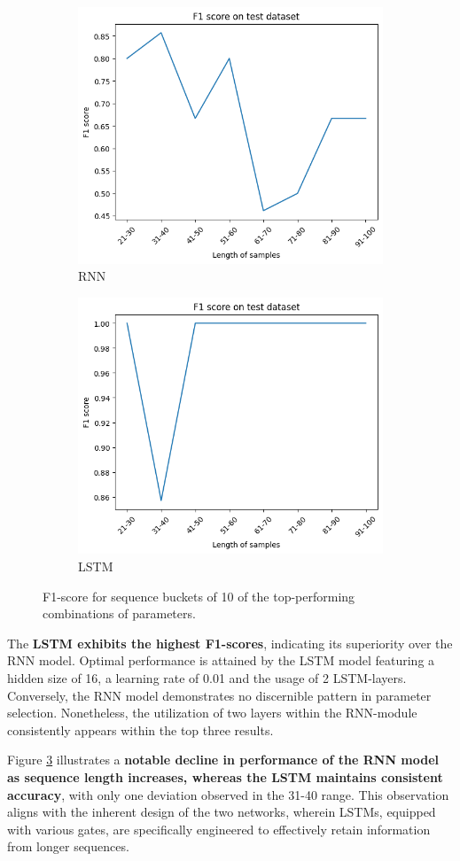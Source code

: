 \documentclass[12pt,a4paper]{article}
\begin{document}
\begin{figure}[!htb]
\centering
\begin{subfigure}{.5\textwidth}
  \centering
  \includegraphics[width=.6\linewidth]{Assignment_3/Report/Figures/rnn.png}
  \caption{RNN}
  \label{fig:sub1}
\end{subfigure}%
\begin{subfigure}{.5\textwidth}
  \centering
  \includegraphics[width=.6\linewidth]{Assignment_3/Report/Figures/lstm.png}
  \caption{LSTM}
  \label{fig:sub2}
\end{subfigure}
\caption{F1-score for sequence buckets of 10 of the top-performing combinations of parameters.}
\label{fig:test}
\end{figure}

The \textbf{LSTM exhibits the highest F1-scores}, indicating its superiority over the RNN model. Optimal performance is attained by the LSTM model featuring a hidden size of 16, a learning rate of 0.01 and the usage of 2 LSTM-layers. Conversely, the RNN model demonstrates no discernible pattern in parameter selection. Nonetheless, the utilization of two layers within the RNN-module consistently appears within the top three results.

Figure \ref{fig:test} illustrates a \textbf{notable decline in performance of the RNN model as sequence length increases, whereas the LSTM maintains consistent accuracy}, with only one deviation observed in the 31-40 range. This observation aligns with the inherent design of the two networks, wherein LSTMs, equipped with various gates, are specifically engineered to effectively retain information from longer sequences.
\end{document}
